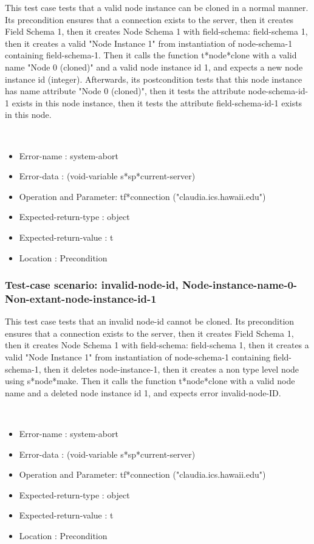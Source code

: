 This test case tests that a valid node instance can be cloned in a normal manner.
Its precondition ensures that a connection exists to the server, then it creates Field Schema 1, then it creates Node Schema 1 with field-schema: field-schema 1, then it creates a valid "Node Instance 1" from instantiation of node-schema-1 containing field-schema-1.
Then it calls the function t*node*clone  with a valid name "Node 0 (cloned)" and a valid node instance id 1, and expects a new node instance id (integer).
Afterwards, its postcondition tests that this node instance has name attribute "Node 0 (cloned)", then it tests the attribute node-schema-id-1 exists in this node instance, then it tests the attribute field-schema-id-1 exists in this node.


\
\begin {itemize}
\item 	Error-name             : system-abort
\item Error-data             : (void-variable s*sp*current-server)
\item Operation and Parameter: tf*connection ("claudia.ics.hawaii.edu")
\item Expected-return-type   : object
\item Expected-return-value  : t
\item Location               : Precondition



\end {itemize}
\subsubsection {Test-case scenario: invalid-node-id, Node-instance-name-0-Non-extant-node-instance-id-1}


This test case tests that an invalid node-id cannot be cloned.
Its precondition ensures that a connection exists to the server, then it creates Field Schema 1, then it creates Node Schema 1 with field-schema: field-schema 1, then it creates a valid "Node Instance 1" from instantiation of node-schema-1 containing field-schema-1, then it deletes node-instance-1, then it creates a non type level node using s*node*make.
Then it calls the function t*node*clone  with a valid node name and a deleted node instance id 1, and expects error invalid-node-ID.



\
\begin {itemize}
\item 	Error-name             : system-abort
\item Error-data             : (void-variable s*sp*current-server)
\item Operation and Parameter: tf*connection ("claudia.ics.hawaii.edu")
\item Expected-return-type   : object
\item Expected-return-value  : t
\item Location               : Precondition



\end {itemize}
